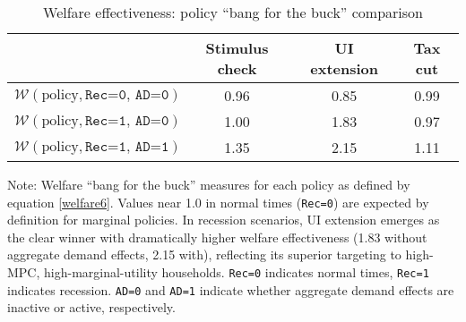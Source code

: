\documentclass[\PathToRoot/\ProjectName]{subfiles}
\begin{document}
\begin{table}[tb] 
  \caption{Welfare effectiveness: policy ``bang for the buck'' comparison}
  \whenintegrated{\label{tab:welfare6}}
  \centering

  \begin{tabular*}
    {\textwidth}{@{\extracolsep{\fill}}lccc@{}} %
    \hline
    & Stimulus check & UI extension & Tax cut \\ \hline
    $\mathcal{W}(\text{policy}, \texttt{Rec=0, AD=0})$ & 0.96           & 0.85         & 0.99    \\
    \addlinespace
    $\mathcal{W}(\text{policy}, \texttt{Rec=1, AD=0})$ & 1.00           & 1.83         & 0.97    \\
    $\mathcal{W}(\text{policy}, \texttt{Rec=1, AD=1})$ & 1.35           & 2.15         & 1.11    \\
    \hline
  \end{tabular*}

  \parbox{\textwidth}{
    \medskip
    \footnotesize Note: Welfare ``bang for the buck'' measures for each policy as defined by equation \eqref{welfare6}. Values near 1.0 in normal times (\texttt{Rec=0}) are expected by definition for marginal policies. In recession scenarios, UI extension emerges as the clear winner with dramatically higher welfare effectiveness (1.83 without aggregate demand effects, 2.15 with), reflecting its superior targeting to high-MPC, high-marginal-utility households. \texttt{Rec=0} indicates normal times, \texttt{Rec=1} indicates recession. \texttt{AD=0} and \texttt{AD=1} indicate whether aggregate demand effects are inactive or active, respectively.
  }

\end{table}

\vspace{0.5em}

\smartbib
\end{document}

